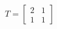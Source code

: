 \documentclass[preview]{standalone}
\begin{document}
\begin{align*}
T = \begin{bmatrix} 2 & 1 \\ 1 & 1\end{bmatrix}
\end{align*}
\end{document}
